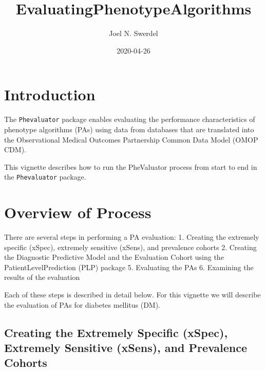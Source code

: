 \documentclass[
]{article}
\title{EvaluatingPhenotypeAlgorithms}
\author{Joel N. Swerdel}
\date{2020-04-26}
\begin{document}
\maketitle

{
\setcounter{tocdepth}{3}
\tableofcontents
}
\newpage

\hypertarget{introduction}{%
\section{Introduction}\label{introduction}}

The \texttt{Phevaluator} package enables evaluating the performance
characteristics of phenotype algorithms (PAs) using data from databases
that are translated into the Observational Medical Outcomes Partnership
Common Data Model (OMOP CDM).

This vignette describes how to run the PheValuator process from start to
end in the \texttt{Phevaluator} package.

\hypertarget{overview-of-process}{%
\section{Overview of Process}\label{overview-of-process}}

There are several steps in performing a PA evaluation: 1. Creating the
extremely specific (xSpec), extremely sensitive (xSens), and prevalence
cohorts 2. Creating the Diagnostic Predictive Model and the Evaluation
Cohort using the PatientLevelPrediction (PLP) package 5. Evaluating the
PAs 6. Examining the results of the evaluation

Each of these steps is described in detail below. For this vignette we
will describe the evaluation of PAs for diabetes mellitus (DM).

\hypertarget{creating-the-extremely-specific-xspec-extremely-sensitive-xsens-and-prevalence-cohorts}{%
\subsection{Creating the Extremely Specific (xSpec), Extremely Sensitive
(xSens), and Prevalence
Cohorts}\label{creating-the-extremely-specific-xspec-extremely-sensitive-xsens-and-prevalence-cohorts}}
\end{document}
